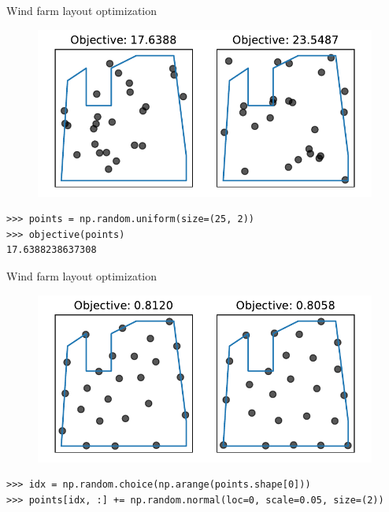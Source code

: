 \documentclass[12pt, aspectratio=149]{beamer}
\theoremstyle{plain}
\begin{document}
\begin{frame}[fragile]{Wind farm layout optimization}
\vspace*{-1em}
\begin{center}
 \begin{figure}
    	\centering
    	\includegraphics[width=0.99\linewidth]{figures/windfarm_random_solution}
 \end{figure}
 \end{center}
\vspace*{-2em}
\begin{center}
\begin{verbatim}
>>> points = np.random.uniform(size=(25, 2))
>>> objective(points)
17.6388238637308
\end{verbatim}
\end{center}
\end{frame}

\begin{frame}[fragile]{Wind farm layout optimization}
\vspace*{-1em}
\begin{center}
 \begin{figure}
    	\centering
    	\includegraphics[width=0.99\linewidth]{figures/windfarm_hc}
 \end{figure}
 \end{center}
\vspace*{-2em}
\begin{center}
\begin{verbatim}
>>> idx = np.random.choice(np.arange(points.shape[0]))
>>> points[idx, :] += np.random.normal(loc=0, scale=0.05, size=(2))
\end{verbatim}
\end{center}
\end{frame}
\end{document}
